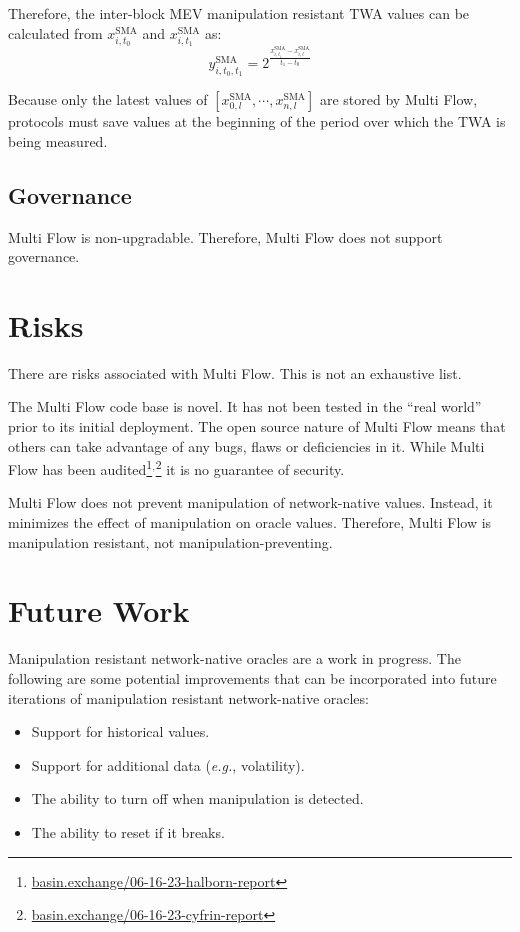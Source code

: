 \documentclass[tikz]{article}
\begin{document}
Therefore, the inter-block MEV manipulation resistant TWA values can be calculated from $x^{\text{SMA}}_{i,t_0}$ and $x^{\text{SMA}}_{i,t_1}$ as:
$$
y^{\text{SMA}}_{i,t_0,t_1} = 2^{\frac{x^{\text{SMA}}_{i,t_1} - x^{\text{SMA}}_{i,l}}{t_1-t_0}}
$$

Because only the latest values of $[x^{\text{SMA}}_{0,l}, \cdots, x^{\text{SMA}}_{n,l}]$ are stored by Multi Flow, protocols must save values at the beginning of the period over which the TWA is being measured.

\subsection{Governance}
Multi Flow is non-upgradable. Therefore, Multi Flow does not support governance.

\vspace{-1mm}
\section{Risks}
\vspace{-1mm}
There are risks associated with Multi Flow. This is not an exhaustive list.

The Multi Flow code base is novel. It has not been tested in the “real world” prior to its initial deployment. The open source nature of Multi Flow means that others can take advantage of any bugs, flaws or deficiencies in it. While Multi Flow has been audited\footnote{\href{https://basin.exchange/06-16-23-halborn-report}{basin.exchange/06-16-23-halborn-report}}$^{,}$\footnote{\href{https://basin.exchange/06-16-23-cyfrin-report}{basin.exchange/06-16-23-cyfrin-report}} it is no guarantee of security. 

Multi Flow does not prevent manipulation of network-native values. Instead, it minimizes the effect of manipulation on oracle values. Therefore, Multi Flow is manipulation resistant, not manipulation-preventing. 

\vspace{-1mm}
\section{Future Work}
\vspace{-1mm}
Manipulation resistant network-native oracles are a work in progress. The following are some potential improvements that can be incorporated into future iterations of manipulation resistant network-native oracles:

\begin{itemize}
\item Support for historical values.
\item Support for additional data (\textit{e.g.}, volatility).
\item The ability to turn off when manipulation is detected.
\item The ability to reset if it breaks.
\end{itemize}
\end{document}
